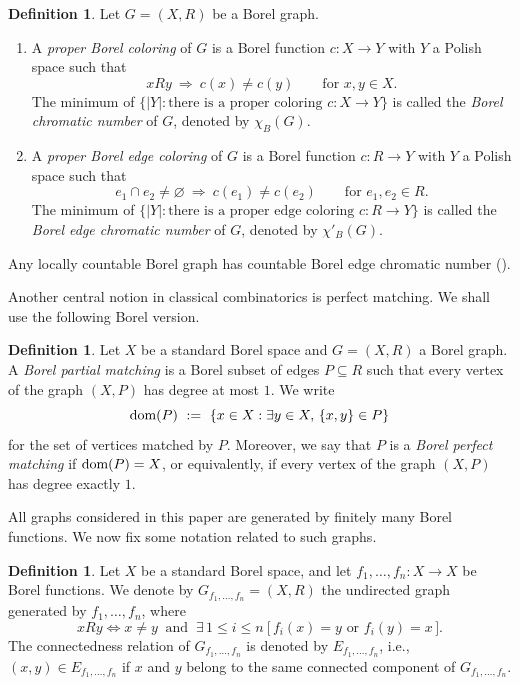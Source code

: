 \documentclass[11pt, reqno, a4paper]{amsart}
\theoremstyle{definition}
\newtheorem{definition}[theorem]{Definition}
\theoremstyle{plain}
\newcommand{\dom}{\text{\rm dom}}
\begin{document}
\begin{definition}
Let $G=(X,R)$ be a Borel graph. 
\begin{enumerate}
\item A \emph{ proper Borel coloring} of $G$ is a Borel function $c\colon X\to Y$ with $Y$ a Polish space such that 
$$
xRy \ \Longrightarrow\ c(x)\neq c(y)\qquad \text{for }x,y\in X.
$$
The minimum of $\{|Y|\colon \mbox{there is a proper coloring $c\colon X\to Y$} \}$  is called the \emph{Borel chromatic number} of $G$, denoted by $\chi_B(G)$.
\item A \emph{proper Borel edge coloring} of $G$ is a
Borel function $c:R\to Y$  with $Y$ a Polish space such that 
$$
e_1\cap e_2\neq\varnothing \ \Longrightarrow\ c(e_1)\neq c(e_2)\qquad \text{for }e_1,e_2\in R.
$$
The minimum of $\{|Y|\colon \mbox{there is a proper edge coloring $c\colon R\to Y$}\}$ is called the \emph{Borel edge chromatic number} of $G$, denoted by $\chi'_B(G)$.
\end{enumerate}
\end{definition}

Any locally countable Borel graph has countable Borel edge chromatic number (\cite[Proposition 4.10]{KechrisSoleckiTodorcevic1999}).

Another central notion in classical combinatorics is perfect matching. We shall use the following Borel version.

\begin{definition}
Let $X$ be a standard Borel space and $G=(X,R)$ a Borel graph. A \emph{Borel partial matching} is a Borel subset of edges $P\subseteq R$ such
that every vertex of the graph $(X,P)$ has degree at most $1$. We write
$$
\dom(P)\ :=\ \{x\in X:\exists y\in X,\,\{x,y\}\in P\}
$$
 for the set of vertices matched by $P$. Moreover, we say that $P$ is a \emph{Borel perfect matching} if $\dom(P)=X$, or equivalently, if every vertex of the graph $(X, P)$ has degree exactly $1$.
\end{definition}

All graphs considered in this paper are generated by finitely many Borel
functions. We now fix some notation related to such graphs.

\begin{definition}
Let $X$ be a standard Borel space, and let
$f_1,\ldots,f_n:X\to X$
be Borel functions. We denote by
$G_{f_1,\ldots,f_n}=(X,R)$
the undirected graph generated by $f_1,\ldots,f_n$, where
$$
xRy
 \Longleftrightarrow 
x\neq y
\ \text{ and }\
\exists\,1\le i\le n\ \bigl[\, f_i(x)=y \mbox{ or } f_i(y)=x\,\bigr].
$$
The connectedness relation of $G_{f_1,\dots, f_n}$ is denoted by
$E_{f_1,\ldots,f_n}$, i.e., $(x,y)\in E_{f_1,\dots, f_n}$ if $x$ and $y$ belong to the same connected component of $G_{f_1,\dots, f_n}$.

\end{definition}
\end{document}
